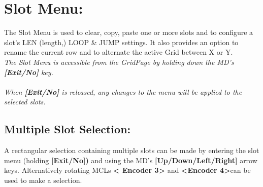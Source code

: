 \chapter{Slot Menu:}
The Slot Menu is used to clear, copy, paste one or more slots and to configure a slot's LEN (length,) LOOP \& JUMP settings. It also provides an option to rename the current row and to alternate the active Grid between X or Y.
\\
\textit{The Slot Menu is accessible from the GridPage by holding down the MD's \textbf{[Exit/No]} key.\\\\When \textbf{[Exit/No]} is released, any changes to the menu will be applied to the selected slots. }
\section{Multiple Slot Selection:}
A rectangular selection containing multiple slots can be made by entering the slot menu (holding \textbf{[Exit/No])} and using the MD's \textbf{[Up/Down/Left/Right]} arrow keys. 
Alternatively rotating MCLs \textbf{< Encoder 3>} and \textbf{<Encoder 4>}can be used to make a selection.
